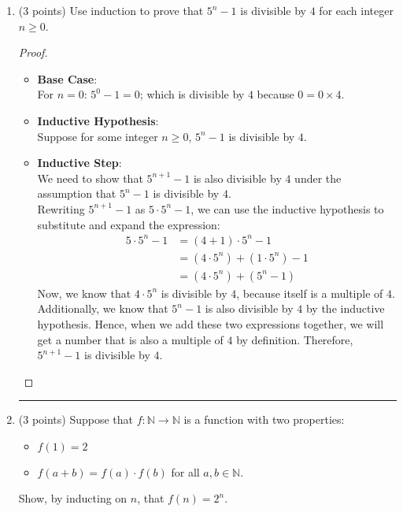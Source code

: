 \documentclass{article}
\def \proofDistance {5pt}
\newcommand{\proofseparator}{\par\noindent\rule{\textwidth}{0.4pt}}
\newcommand{\N}{\ensuremath{\mathbb{N}}}
\newcommand{\pf}[1]{
    \vspace{\proofDistance}
    \begin{proof}
    #1
    \end{proof}
    \proofseparator
}
\begin{document}
\begin{enumerate}
\newpage


    \item (3 points) Use induction to prove that $5^n - 1$ is divisible by $4$ for each integer $n \geq 0$.
    \pf{\hfill
        \begin{itemize}
            \item \textbf{Base Case}: \\
            For $n = 0$: $5^0 - 1 = 0$; which is divisible by $4$ because $0 = 0 \times 4$. \\

            \item \textbf{Inductive Hypothesis}: \\
            Suppose for some integer $n \geq 0$, $5^n - 1$ is divisible by $4$. \\ 

            \item \textbf{Inductive Step}: \\
            We need to show that $5^{n + 1} - 1$ is also divisible by $4$ under the assumption that $5^n - 1$ is divisible by $4$. \\

            Rewriting $5^{n + 1} - 1$ as $5\cdot 5^n - 1$, we can use the inductive hypothesis to substitute and expand the expression: 
            \begin{align*}
                5\cdot 5^n - 1 &= (4+1)\cdot 5^n - 1 \\
                &= (4 \cdot 5^n) + (1 \cdot 5^n) - 1 \\
                &= (4\cdot 5^n) + (5^n - 1)
            \end{align*}
            Now, we know that $4\cdot 5^n$ is divisible by $4$, because itself is a multiple of $4$. Additionally, we know that $5^n - 1$ is also divisible by $4$ by the inductive hypothesis. Hence, when we add these two expressions together, we will get a number that is also a multiple of $4$ by definition. Therefore, $5^{n+1} - 1$ is divisible by $4$.
        \end{itemize}
    }
    

\newpage

    \item (3 points) Suppose that $f \colon \N \rightarrow \N$ is a function with two properties: 
    \begin{itemize}
        \item $f(1) = 2$
        \item $f(a + b) = f(a)\cdot f(b)$ for all $a,b\in \N$.
    \end{itemize}
    Show, by inducting on $n$, that $f(n) = 2^n$. \\


\end{enumerate}
\end{document}
